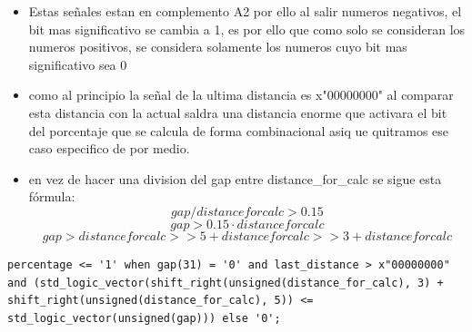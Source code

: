 \begin{itemize}
    \item Estas señales estan en complemento A2 por ello al salir numeros negativos, el bit mas significativo se cambia a 1, es por ello que como solo se consideran los numeros positivos, se
     considera solamente los numeros cuyo bit mas significativo sea 0
    \item como al principio la señal de la ultima distancia es x"00000000" al comparar esta distancia con la actual saldra una distancia enorme que activara el bit del porcentaje que se calcula 
    de forma combinacional asiq ue quitramos ese caso especifico de por medio.
    \item en vez de hacer una division del gap entre distance\_for\_calc se sigue esta fórmula:
    \[ gap/distanceforcalc > 0.15\] 
    \[gap > 0.15 \cdot distanceforcalc \] 
    \[gap > distanceforcalc>> 5 + distanceforcalc>> 3 + distanceforcalc\] 
\end{itemize}

\lstset{language=VHDL, breaklines=true, basicstyle=\footnotesize}
\begin{lstlisting}[frame=single]
    percentage <= '1' when gap(31) = '0' and last_distance > x"00000000" and (std_logic_vector(shift_right(unsigned(distance_for_calc), 3) + shift_right(unsigned(distance_for_calc), 5)) <= std_logic_vector(unsigned(gap))) else '0';
\end{lstlisting}


